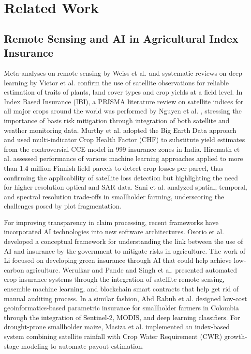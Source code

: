 \documentclass[conference]{IEEEtran}
\begin{document}
\section{Related Work}

\subsection{Remote Sensing and AI in Agricultural Index Insurance}
Meta-analyses on remote sensing by Weiss et al. \cite{b20} and systematic reviews on deep learning by Victor et al. \cite{b19} confirm the use of satellite observations for reliable estimation of traits of plants, land cover types and crop yields at a field level. In Index Based Insurance (IBI), a PRISMA literature review on satellite indices for all major crops around the world was performed by Nguyen et al. \cite{b11}, stressing the importance of basis risk mitigation through integration of both satellite and weather monitoring data. Murthy et al. \cite{b2} adopted the Big Earth Data approach and used multi-indicator Crop Health Factor (CHF) to substitute yield estimates from the controversial CCE model in 999 insurance zones in India. Hiremath et al. \cite{b12} assessed performance of various machine learning approaches applied to more than 1.4 million Finnish field parcels to detect crop losses per parcel, thus confirming the applicability of satellite loss detection but highlighting the need for higher resolution optical and SAR data. Sani et al. \cite{b18} analyzed spatial, temporal, and spectral resolution trade-offs in smallholder farming, underscoring the challenges posed by plot fragmentation.

For improving transparency in claim processing, recent frameworks have incorporated AI technologies into new software architectures. Osorio et al. \cite{b6} developed a conceptual framework for understanding the link between the use of AI and insurance by the government to mitigate risks in agriculture. The work of Li \cite{b8} focused on developing green insurance through AI that could help achieve low-carbon agriculture. Werulkar and Pande \cite{b7} and Singh et al. \cite{b9} presented automated crop insurance systems through the integration of satellite remote sensing, ensemble machine learning, and blockchain smart contracts that help get rid of manual auditing process. In a similar fashion, Abd Rabuh et al. \cite{b10} designed low-cost geoinformatics-based parametric insurance for smallholder farmers in Colombia through the integration of Sentinel-2, MODIS, and deep learning classifiers. For drought-prone smallholder maize, Masiza et al. \cite{b16} implemented an index-based system combining satellite rainfall with Crop Water Requirement (CWR) growth-stage modeling to automate payout estimation.
\end{document}
